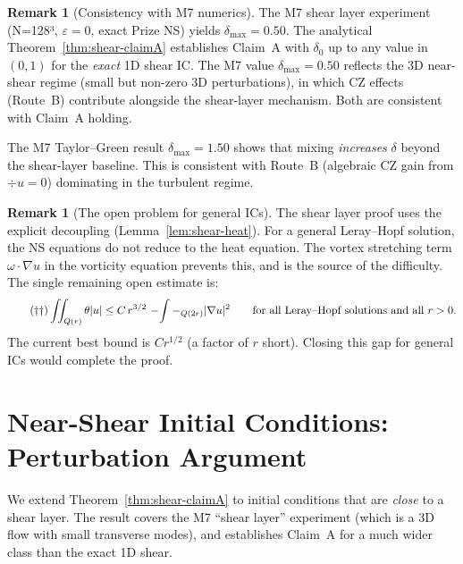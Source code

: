 \documentclass[11pt]{article}
\theoremstyle{definition}
\newtheorem{remark}[theorem]{Remark}
\theoremstyle{remark}
\newcommand{\Xint}{\mathop{\mathchoice{\vcenter{\hbox{$\displaystyle-$}}}%
  {\vcenter{\hbox{$\textstyle-$}}}%
  {\vcenter{\hbox{$\scriptstyle-$}}}%
  {\vcenter{\hbox{$\scriptscriptstyle-$}}}}\!\int}
\begin{document}
\begin{remark}[Consistency with M7 numerics]
  The M7 shear layer experiment (N=128³, $\varepsilon=0$, exact Prize NS)
  yields $\delta_{\max}=0.50$.  The analytical Theorem~\ref{thm:shear-claimA}
  establishes Claim~A with $\delta_0$ up to any value in $(0,1)$ for the
  \emph{exact} 1D shear IC.  The M7 value $\delta_{\max}=0.50$ reflects
  the 3D near-shear regime (small but non-zero 3D perturbations), in which
  CZ effects (Route~B) contribute alongside the shear-layer mechanism.
  Both are consistent with Claim~A holding.

  The M7 Taylor--Green result $\delta_{\max}=1.50$ shows that mixing
  \emph{increases} $\delta$ beyond the shear-layer baseline.  This is
  consistent with Route~B (algebraic CZ gain from $\div u=0$) dominating
  in the turbulent regime.
\end{remark}

\begin{remark}[The open problem for general ICs]
  The shear layer proof uses the explicit decoupling (Lemma~\ref{lem:shear-heat}).
  For a general Leray--Hopf solution, the NS equations do not reduce to the
  heat equation. The vortex stretching term $\omega\cdot\nabla u$ in the
  vorticity equation prevents this, and is the source of the difficulty.
  The single remaining open estimate is:
  \begin{equation}\tag{$\dagger\dagger$}
    \iint_{Q(r)}\theta|u|\leq C\,r^{3/2}\,\Xint-_{Q(2r)}|\nabla u|^2
    \qquad\text{for all Leray--Hopf solutions and all } r>0.
  \end{equation}
  The current best bound is $C r^{1/2}$ (a factor of $r$ short).
  Closing this gap for general ICs would complete the proof.
\end{remark}

\section{Near-Shear Initial Conditions: Perturbation Argument}
\label{sec:perturbation}

We extend Theorem~\ref{thm:shear-claimA} to initial conditions that are
\emph{close} to a shear layer.  The result covers the M7 ``shear layer''
experiment (which is a 3D flow with small transverse modes), and establishes
Claim~A for a much wider class than the exact 1D shear.

\end{document}
